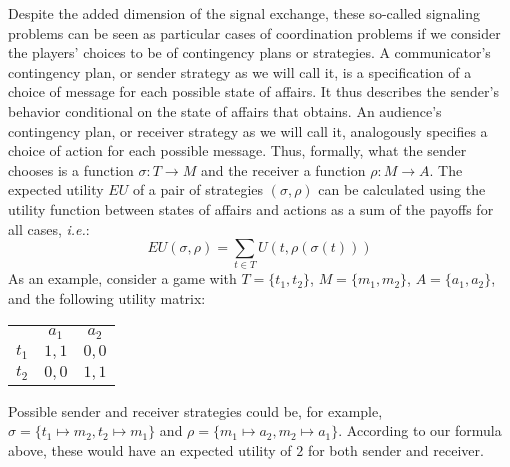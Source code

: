 \documentclass[a4paper]{article}
\begin{document}
Despite the added dimension of the signal exchange, these so-called signaling problems can be seen as particular cases of coordination problems if we consider the players' choices to be of contingency plans or strategies.
A communicator's contingency plan, or sender strategy as we will call it, is a specification of a choice of message for each possible state of affairs.
It thus describes the sender's behavior conditional on the state of affairs that obtains.
An audience's contingency plan, or receiver strategy as we will call it, analogously specifies a choice of action for each possible message.
Thus, formally, what the sender chooses is a function $\sigma : T \rightarrow M$ and the receiver a function $\rho : M \rightarrow A$.
The expected utility $EU$ of a pair of strategies $(\sigma,\rho)$ can be calculated using the utility function between states of affairs and actions as a sum of the payoffs for all cases, \emph{i.e.}:
$$
EU(\sigma, \rho) = \sum_{t \in T} U(t, \rho(\sigma(t)))
$$
As an example, consider a game with $T = \lbrace t_1, t_2 \rbrace$, $M = \lbrace m_1, m_2 \rbrace$, $A = \lbrace a_1, a_2 \rbrace$, and the following utility matrix:
\begin{center}
\begin{tabular}{r|c|c|}
\multicolumn{1}{r}{}
 & \multicolumn{1}{c}{$a_1$}
 & \multicolumn{1}{c}{$a_2$} \\ \cline{2-3}
   $t_1$ & $1,1$ & $0,0$ \\ \cline{2-3}
   $t_2$ & $0,0$ & $1,1$ \\ \cline{2-3}
\end{tabular}
\end{center}
Possible sender and receiver strategies could be, for example, $\sigma = \lbrace t_1 \mapsto m_2, t_2 \mapsto m_1 \rbrace$ and $\rho = \lbrace m_1 \mapsto a_2, m_2 \mapsto a_1 \rbrace$.
According to our formula above, these would have an expected utility of $2$ for both sender and receiver.
\end{document}
